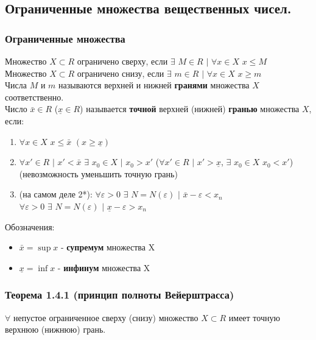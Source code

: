 \documentclass[12pt]{article}
\begin{document}
    \subsection{Ограниченные множества вещественных чисел.}
    \subsubsection*{Ограниченные множества}
    \noindent Множество $X \subset R$ ограничено сверху, если $\exists$ $M \in R$ $|$ $\forall x \in X$ $x \le M$\\
    Множество $X \subset R$ ограничено снизу, если $\exists$ $m \in R$ $|$ $\forall x \in X$ $x \ge m$\\
    Числа $M$ и $m$ называются верхней и нижней \textbf{гранями} множества $X$ соответственно.\\
    Число $\bar{x} \in R$ ($\underline{x} \in R$) называется \textbf{точной} верхней (нижней) \textbf{гранью} множества $X$, если:
    \begin{enumerate}
        \item $\forall x \in X$ $x \le \bar{x}$ $(x \ge \underline{x})$
        \item $\forall x' \in R$ $|$ $x' < \bar{x}$ $\exists$ $x_{0} \in X$ $|$ $x_{0} > x'$ ($\forall x' \in R$ $|$ $x' > \underline{x}$, $\exists$ $x_{0} \in X$ $x_{0} < x'$) (невозможность уменьшить точную грань)
        \item (на самом деле 2*): $\forall \varepsilon > 0$ $\exists$ $N = N(\varepsilon)$ $|$ $\bar{x} - \varepsilon < x_n$\\
        $\forall \varepsilon > 0$ $\exists$ $N = N(\varepsilon)$ $|$ $\underline{x} - \varepsilon > x_n$
    \end{enumerate} 
    Обозначения:
    \begin{itemize}
        \item $\bar{x} = \sup x$ - \textbf{супремум} множества X
        \item $\underline{x} = \inf x$ - \textbf{инфинум} множества X
    \end{itemize}
    \subsubsection*{Теорема 1.4.1 (принцип полноты Вейерштрасса)}\label{th:1.4.1}
    $\forall$ непустое ограниченное сверху (снизу) множество $X \subset R$ имеет точную верхнюю (нижнюю) грань.
\end{document}
